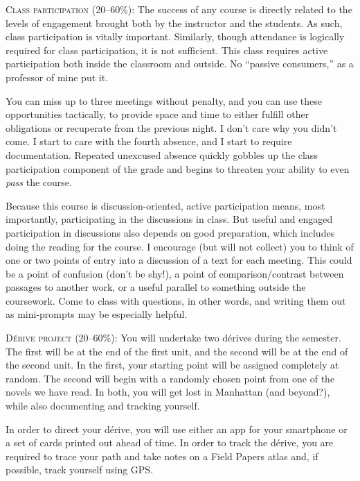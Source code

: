 \begin{description}

  \item \textsc{Class participation (20–60\%):} The success of any course is
    directly related to the levels of engagement brought both by the instructor
    and the students. As such, class participation is vitally important.
    Similarly, though attendance is logically required for class participation,
    it is not sufficient. This class requires active participation both inside
    the classroom and outside. No “passive consumers,” as a professor of mine
    put it. 
    
    You can miss up to three meetings without penalty, and you can use these
    opportunities tactically, to provide space and time to either fulfill
    other obligations or recuperate from the previous night. I don’t care why
    you didn’t come. I start to care with the fourth absence, and I start to
    require documentation. Repeated unexcused absence quickly gobbles up the
    class participation component of the grade and begins to threaten your
    ability to even \textit{pass} the course.

    Because this course is discussion-oriented, active participation means,
    most importantly, participating in the discussions in class. But useful and
    engaged participation in discussions also depends on good preparation,
    which includes doing the reading for the course. I encourage (but will not
    collect) you to think of one or two points of entry into a discussion of a
    text for each meeting. This could be a point of confusion (don’t be shy!),
    a point of comparison/contrast between passages to another work, or a
    useful parallel to something outside the coursework. Come to class with
    questions, in other words, and writing them out as mini-prompts may be
    especially helpful.

  \item \textsc{Dérive project (20–60\%):} You will undertake two dérives during
    the semester. The first will be at the end of the first unit, and the
    second will be at the end of the second unit. In the first, your starting
    point will be assigned completely at random. The second will begin with a
    randomly chosen point from one of the novels we have read. In both, you
    will get lost in Manhattan (and beyond?), while also documenting and
    tracking yourself.
    
    In order to direct your dérive, you will use either an app for your
    smartphone or a set of cards printed out ahead of time. In order to track
    the dérive, you are required to trace your path and take notes on a Field
    Papers atlas and, if possible, track yourself using GPS.


\end{description}
